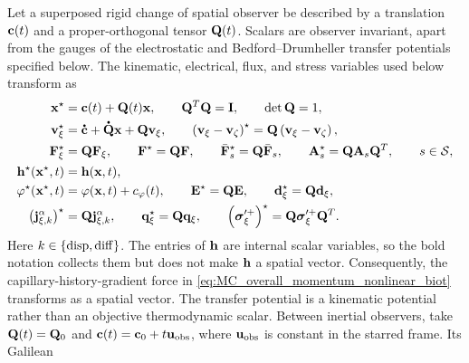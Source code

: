 Let a superposed rigid change of spatial observer be described by a translation
\(\mathbf{c}(t)\) and a proper-orthogonal tensor \(\mathbf{Q}(t)\).  Scalars are
observer invariant, apart from the gauges of the electrostatic and
Bedford--Drumheller transfer potentials specified below.  The kinematic,
electrical, flux, and stress variables used below transform as
%
\begin{subequations}
	\label{eq:observer_change_rules}
	\begin{align}
		\mbf x^\star
		 & =
		\mbf c(t)+\mbf Q(t)\mbf x,
		\qquad
		\mbf Q^T\mbf Q=\mbf I,
		\qquad
		\det\mbf Q=1,
		\label{eq:observer_position_rule} \\
		\mbf v_\xi^\star
		 & =
		\phasedot{\mbf c}+\phasedot{\mbf Q}\mbf x+\mbf Q\mbf v_\xi,
		\qquad
		\left(
		\mbf v_\xi-\mbf v_\zeta
		\right)^\star
		=
		\mbf Q
		\left(
		\mbf v_\xi-\mbf v_\zeta
		\right),
		\label{eq:observer_velocity_rule} \\
		\mbf F_\xi^\star
		 & =
		\mbf Q\mbf F_\xi,
		\qquad
		\mbf F^\star=\mbf Q\mbf F,
		\qquad
		\bar{\mbf F}_s^\star=\mbf Q\bar{\mbf F}_s,
		\qquad
		\mbf A_s^\star=\mbf Q\mbf A_s\mbf Q^T,
		\qquad
		s\in\mc S,
		\label{eq:observer_deformation_rules} \\
		\mbf h^\star(\mbf x^\star,t)
		 & =
		\mbf h(\mbf x,t),
		\label{eq:observer_capillary_history_rule} \\
		\varphi^\star(\mbf x^\star,t)
		 & =
		\varphi(\mbf x,t)+c_\varphi(t),
		\qquad
		\mbf E^\star=\mbf Q\mbf E,
		\qquad
		\mbf d_\xi^\star=\mbf Q\mbf d_\xi,
		\label{eq:observer_electrical_rules} \\
		\left(
		\mbf j_{\xi,k}^\alpha
		\right)^\star
		 & =
		\mbf Q\mbf j_{\xi,k}^\alpha,
		\qquad
		\mbf q_\xi^\star=\mbf Q\mbf q_\xi,
		\qquad
		\left(
		\bs\sigma_\xi^{\prime+}
		\right)^\star
		=
		\mbf Q\bs\sigma_\xi^{\prime+}\mbf Q^T .
		\label{eq:observer_flux_stress_rules}
	\end{align}
\end{subequations}
%
Here \(k\in\{{\rm disp},{\rm diff}\}\).  The entries of \(\mathbf{h}\) are
internal scalar variables, so the bold notation collects them but does not make
\(\mathbf{h}\) a spatial vector.  Consequently, the capillary-history-gradient
force in \eqref{eq:MC_overall_momentum_nonlinear_biot} transforms as a spatial
vector.
The transfer potential is a kinematic potential rather than an objective
thermodynamic scalar.  Between inertial observers, take
\(\mathbf{Q}(t)=\mathbf{Q}_0\) and
\(\mathbf{c}(t)=\mathbf{c}_0+t\mathbf{u}_{\rm obs}\), where
\(\mathbf{u}_{\rm obs}\) is constant in the starred frame.  Its Galilean
